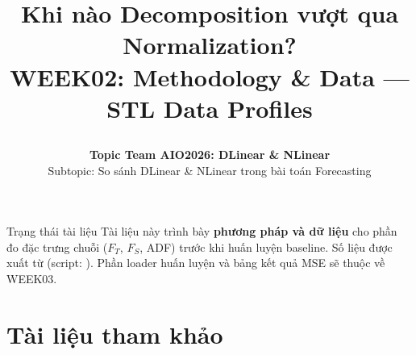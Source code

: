 \documentclass[12pt]{article}
\title{%
  \parbox[c][\TitleBlockHeight][c]{0.90\textwidth}{%
    \centering
    {\fontsize{18pt}{22pt}\selectfont\bfseries
      Khi nào Decomposition vượt qua Normalization?}\\[0.35em]
    {\fontsize{13pt}{16pt}\selectfont
      WEEK02: Methodology \& Data --- STL Data Profiles}
  }%
}
\author{%
  \textbf{Topic Team AIO2026: DLinear \& NLinear}\\[0.4em]
  {\small Subtopic: So sánh DLinear \& NLinear trong bài toán Forecasting}
}
\date{}
\begin{document}
\maketitle
\thispagestyle{firstpage}
\vspace{-2em}

\begin{infobox}{Trạng thái tài liệu}
  Tài liệu này trình bày \textbf{phương pháp và dữ liệu} cho phần đo đặc trưng chuỗi
  (\(F_T\), \(F_S\), ADF) trước khi huấn luyện baseline.
  Số liệu được xuất từ 
  (script: ).
  Phần loader huấn luyện và bảng kết quả MSE sẽ thuộc về WEEK03.
\end{infobox}






\section*{Tài liệu tham khảo}
\printbibliography[heading=none]
\end{document}
